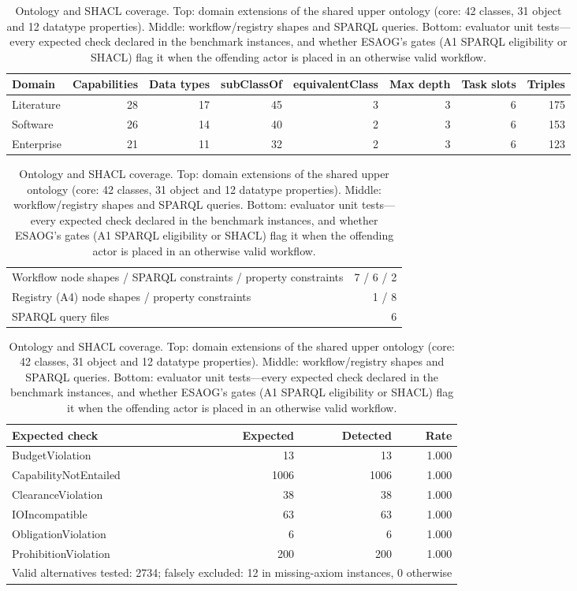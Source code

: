 \begin{table}[H]
\centering
\caption{Ontology and SHACL coverage. Top: domain extensions of the shared upper ontology (core: 42 classes, 31 object and 12 datatype properties). Middle: workflow/registry shapes and SPARQL queries. Bottom: evaluator unit tests---every expected check declared in the benchmark instances, and whether ESAOG's gates (A1 SPARQL eligibility or SHACL) flag it when the offending actor is placed in an otherwise valid workflow.}
\label{tab:coverage}
\scriptsize
\begin{tabular}{lrrrrrrr}
\toprule
Domain & Capabilities & Data types & subClassOf & equivalentClass & Max depth & Task slots & Triples\\
\midrule
Literature & 28 & 17 & 45 & 3 & 3 & 6 & 175\\
Software & 26 & 14 & 40 & 2 & 3 & 6 & 153\\
Enterprise & 21 & 11 & 32 & 2 & 3 & 6 & 123\\
\bottomrule
\end{tabular}

\vspace{4pt}
\begin{tabular}{lr}
\toprule
Workflow node shapes / SPARQL constraints / property constraints & 7 / 6 / 2\\
Registry (A4) node shapes / property constraints & 1 / 8\\
SPARQL query files & 6\\
\bottomrule
\end{tabular}

\vspace{4pt}
\begin{tabular}{lrrr}
\toprule
Expected check & Expected & Detected & Rate\\
\midrule
BudgetViolation & 13 & 13 & 1.000\\
CapabilityNotEntailed & 1006 & 1006 & 1.000\\
ClearanceViolation & 38 & 38 & 1.000\\
IOIncompatible & 63 & 63 & 1.000\\
ObligationViolation & 6 & 6 & 1.000\\
ProhibitionViolation & 200 & 200 & 1.000\\
\midrule
\multicolumn{4}{l}{Valid alternatives tested: 2734; falsely excluded: 12 in missing-axiom instances, 0 otherwise}\\
\bottomrule
\end{tabular}
\end{table}
